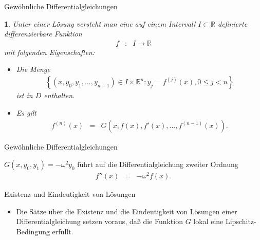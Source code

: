 \documentclass[german]{beamer}
\newcommand{\bq}{\begin{eqnarray*}}
\newcommand{\eq}{\end{eqnarray*}}
\newtheorem*{myemptytheorem}{}
\begin{document}
\begin{frame}{Gew\"ohnliche Differentialgleichungen}

\begin{myemptytheorem}
Unter einer L\"osung versteht man
eine auf einem Intervall $I \subset \mathbb R$ definierte differenzierbare Funktion
\bq
 f & : & I \rightarrow {\mathbb R}
\eq
mit folgenden Eigenschaften:
\begin{itemize}
\item Die Menge
\bq
 \left\{ (x,y_0,y_1,...,y_{n-1}) \in I \times {\mathbb R}^n : y_j = f^{(j)}(x), 0 \le j < n \right\}
\eq
ist in $D$ enthalten.
\item Es gilt
\bq
 f^{(n)}(x) & = & G\left(x,f(x),f'(x),...,f^{(n-1)}(x)\right).
\eq
\end{itemize}
\end{myemptytheorem}

\end{frame}

\begin{frame}{Gew\"ohnliche Differentialgleichungen}

\begin{example}
$G(x,y_0,y_1)=-\omega^2 y_0$ f\"uhrt auf die Differentialgleichung zweiter Ordnung
\bq
 f''(x) & = & - \omega^2 f(x).
\eq
\end{example}

\end{frame}

\begin{frame}{Existenz und Eindeutigkeit von L\"osungen}

\begin{itemize}
\item Die S\"atze \"uber die Existenz und die Eindeutigkeit von L\"osungen einer Differentialgleichung setzen voraus,
da{\ss} die Funktion $G$ lokal eine Lipschitz-Bedingung erf\"ullt.
\end{itemize}

\end{frame}
\end{document}
